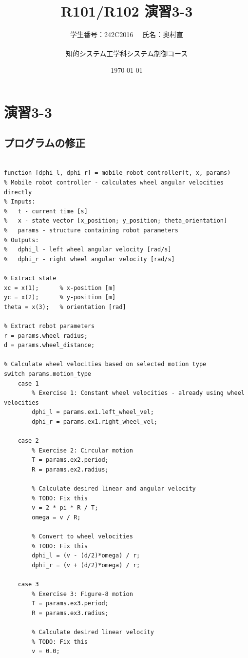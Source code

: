 \documentclass[10pt,a4paper,titlepage]{jreport} %
\title{R101/R102 演習3-3} %
\author{
  学生番号：242C2016 　氏名：奥村直 \\
  \\
  知的システム工学科システム制御コース
  } %
\date{\today} %
\begin{document}
\maketitle

\chapter{演習3-3}

\section{プログラムの修正}

\begin{lstlisting}[caption=modified＿mobile＿robot＿controller.m]

function [dphi_l, dphi_r] = mobile_robot_controller(t, x, params)
% Mobile robot controller - calculates wheel angular velocities directly
% Inputs:
%   t - current time [s]
%   x - state vector [x_position; y_position; theta_orientation]
%   params - structure containing robot parameters
% Outputs:
%   dphi_l - left wheel angular velocity [rad/s]
%   dphi_r - right wheel angular velocity [rad/s]

% Extract state
xc = x(1);      % x-position [m]
yc = x(2);      % y-position [m]
theta = x(3);   % orientation [rad]

% Extract robot parameters
r = params.wheel_radius;
d = params.wheel_distance;

% Calculate wheel velocities based on selected motion type
switch params.motion_type
    case 1
        % Exercise 1: Constant wheel velocities - already using wheel velocities
        dphi_l = params.ex1.left_wheel_vel;
        dphi_r = params.ex1.right_wheel_vel;
        
    case 2
        % Exercise 2: Circular motion
        T = params.ex2.period;
        R = params.ex2.radius;
        
        % Calculate desired linear and angular velocity
        % TODO: Fix this
        v = 2 * pi * R / T;
        omega = v / R;
        
        % Convert to wheel velocities
        % TODO: Fix this
        dphi_l = (v - (d/2)*omega) / r;
        dphi_r = (v + (d/2)*omega) / r;
        
    case 3
        % Exercise 3: Figure-8 motion
        T = params.ex3.period;
        R = params.ex3.radius;
        
        % Calculate desired linear velocity
        % TODO: Fix this
        v = 0.0;
        

\end{lstlisting}
\end{document}
